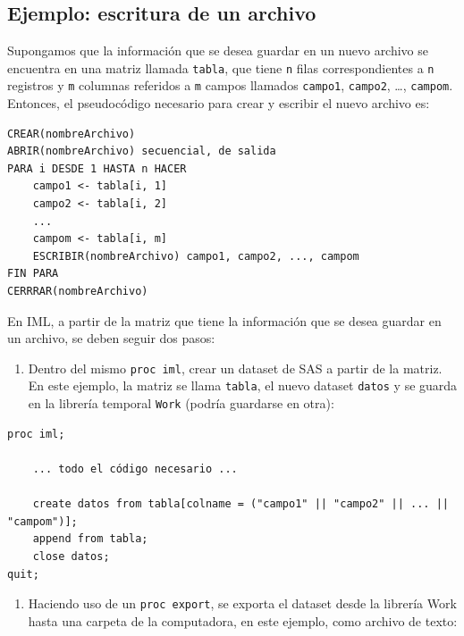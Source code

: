\documentclass[]{book}
\providecommand{\tightlist}{%
  \setlength{\itemsep}{0pt}\setlength{\parskip}{0pt}}
\begin{document}
\hypertarget{ejemplo-escritura-de-un-archivo}{%
\subsection{Ejemplo: escritura de un archivo}\label{ejemplo-escritura-de-un-archivo}}

Supongamos que la información que se desea guardar en un nuevo archivo se encuentra en una matriz llamada \texttt{tabla}, que tiene \texttt{n} filas correspondientes a \texttt{n} registros y \texttt{m} columnas referidos a \texttt{m} campos llamados \texttt{campo1}, \texttt{campo2}, \ldots{}, \texttt{campom}. Entonces, el pseudocódigo necesario para crear y escribir el nuevo archivo es:

\begin{verbatim}
CREAR(nombreArchivo)
ABRIR(nombreArchivo) secuencial, de salida
PARA i DESDE 1 HASTA n HACER
    campo1 <- tabla[i, 1]
    campo2 <- tabla[i, 2]
    ...
    campom <- tabla[i, m]
    ESCRIBIR(nombreArchivo) campo1, campo2, ..., campom
FIN PARA
CERRRAR(nombreArchivo)
\end{verbatim}

En IML, a partir de la matriz que tiene la información que se desea guardar en un archivo, se deben seguir dos pasos:

\begin{enumerate}
\def\labelenumi{\arabic{enumi}.}
\tightlist
\item
  Dentro del mismo \texttt{proc\ iml}, crear un dataset de SAS a partir de la matriz. En este ejemplo, la matriz se llama \texttt{tabla}, el nuevo dataset \texttt{datos} y se guarda en la librería temporal \texttt{Work} (podría guardarse en otra):
\end{enumerate}

\begin{verbatim}
proc iml;
    
    ... todo el código necesario ...

    create datos from tabla[colname = ("campo1" || "campo2" || ... || "campom")];
    append from tabla;
    close datos;
quit;
\end{verbatim}

\begin{enumerate}
\def\labelenumi{\arabic{enumi}.}
\setcounter{enumi}{1}
\tightlist
\item
  Haciendo uso de un \texttt{proc\ export}, se exporta el dataset desde la librería Work hasta una carpeta de la computadora, en este ejemplo, como archivo de texto:
\end{enumerate}
\end{document}
